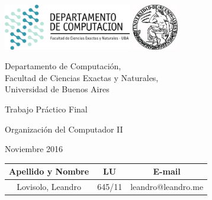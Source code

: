 \documentclass[a4paper, 10pt, twoside]{article}
\newcommand{\titulo}{Trabajo Práctico Final}
\newcommand{\materia}{Organización del Computador II}
\newcommand{\cuatrimestre}{Noviembre 2016}
\begin{document}


\thispagestyle{caratula}

\begin{center}

\includegraphics[height=2cm]{DC.png} 
\hfill
\includegraphics[height=2cm]{UBA.jpg} 

\vspace{2cm}

Departamento de Computación,\\
Facultad de Ciencias Exactas y Naturales,\\
Universidad de Buenos Aires

\vspace{4cm}

\begin{Huge}
\titulo
\end{Huge}

\vspace{0.5cm}

\begin{Large}
\materia
\end{Large}

\vspace{1cm}

\cuatrimestre

\vspace{4cm}

\begin{tabular}{|c|c|c|}
\hline
Apellido y Nombre & LU & E-mail\\
\hline
Lovisolo, Leandro      & 645/11 & leandro@leandro.me\\
\hline
\end{tabular}

\end{center}

\newpage
\end{document}
